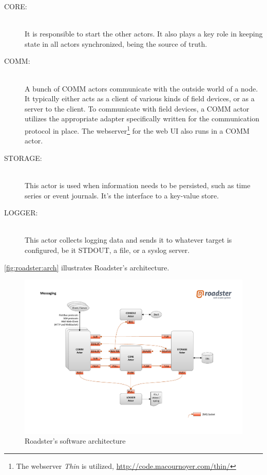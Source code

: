 \begin{description}
	\item [CORE:]\hfill\\
		It is responsible to start the other actors. It also plays a
		key role in keeping state in all actors synchronized, being the
		source of truth.

	\item [COMM:]\hfill\\
		A bunch of COMM actors communicate with the outside world of a
		node. It typically either acts as a client of various kinds of
		field devices, or as a server to the client. To communicate with field devices, a COMM actor
		utilizes the appropriate adapter specifically written for the communication
		protocol in place. The webserver\footnote{The webserver \emph{Thin} is utilized, \url{http://code.macournoyer.com/thin/}} for the web UI also runs in a
		COMM actor.

	\item [STORAGE:]\hfill\\
		This actor is used when information needs to be persisted, such
		as time series or event journals. It's the interface to a
		key-value store.

	\item [LOGGER:]\hfill\\
		This actor collects logging data and sends it to whatever
		target is configured, be it STDOUT, a file, or a syslog server.
\end{description}

\autoref{fig:roadster:arch} illustrates Roadster's architecture.

\begin{figure}[]
	\includegraphics[trim=4cm 2cm 3.5cm 2.8cm, clip=true, width=\textwidth]{img/roadster_arch.pdf}
	\caption{Roadster's software architecture}
	\label{fig:roadster:arch}
\end{figure}

